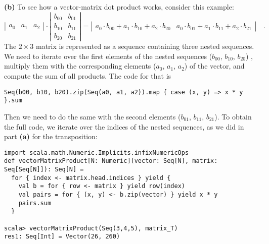 \textbf{(b)} To see how a vector-matrix dot product works, consider
this example:
\[
\left|\begin{array}{ccc}
a_{0} & a_{1} & a_{2}\end{array}\right|\cdot\left|\begin{array}{cc}
b_{00} & b_{01}\\
b_{10} & b_{11}\\
b_{20} & b_{21}
\end{array}\right|=\left|\begin{array}{cc}
a_{0}\cdot b_{00}+a_{1}\cdot b_{10}+a_{2}\cdot b_{20} & a_{0}\cdot b_{01}+a_{1}\cdot b_{11}+a_{2}\cdot b_{21}\end{array}\right|\quad.
\]
The $2\times3$ matrix is represented as a sequence containing three
nested sequences. We need to iterate over the first elements of the
nested sequences ($b_{00}$, $b_{10}$, $b_{20}$) , multiply them
with the corresponding elements ($a_{0}$, $a_{1}$, $a_{2}$) of
the vector, and compute the sum of all products. The code for that
is
\begin{lstlisting}
Seq(b00, b10, b20).zip(Seq(a0, a1, a2)).map { case (x, y) => x * y }.sum
\end{lstlisting}
Then we need to do the same with the second elements ($b_{01}$, $b_{11}$,
$b_{21}$). To obtain the full code, we iterate over the indices of
the nested sequences, as we did in part \textbf{(a)} for the transposition:
\begin{lstlisting}
import scala.math.Numeric.Implicits.infixNumericOps
def vectorMatrixProduct[N: Numeric](vector: Seq[N], matrix: Seq[Seq[N]]): Seq[N] =
  for { index <- matrix.head.indices } yield {
    val b = for { row <- matrix } yield row(index)
    val pairs = for { (x, y) <- b.zip(vector) } yield x * y 
    pairs.sum
  }

scala> vectorMatrixProduct(Seq(3,4,5), matrix_T)
res1: Seq[Int] = Vector(26, 260)
\end{lstlisting}

